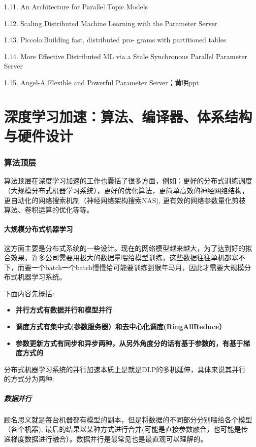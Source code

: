 \documentclass[12pt]{article}
\begin{document}
1.11. An Architecture for Parallel Topic Models

1.12. Scaling Distributed Machine Learning with the Parameter Server

1.13. Piccolo:Building fast, distributed pro- grams with partitioned tables  

1.14. More Effective Distributed ML via a Stale Synchronous Parallel Parameter Server

1.15. Angel-A Flexible and Powerful Parameter Server；黄明ppt

\part{深度学习加速：算法、编译器、体系结构与硬件设计\cite{Deep_Learning_Speed_Up}}
\setcounter{section}{0}
\section{算法顶层}
算法顶层在深度学习加速的工作也囊括了很多方面，例如：更好的分布式训练调度（大规模分布式机器学习系统），更好的优化算法，更简单高效的神经网络结构，更自动化的网络搜索机制（神经网络架构搜索NAS), 更有效的网络参数量化剪枝算法、卷积运算的优化等等。

\subsection{大规模分布式机器学习}
这方面主要是分布式系统的一些设计。现在的网络模型越来越大，为了达到好的拟合效果，许多公司需要用极大的数据量喂给模型训练，这些数据往往单机都塞不下，而要一个batch一个batch慢慢给可能要训练到猴年马月，因此才需要大规模分布式机器学习系统。

下面内容先概括:
\begin{itemize}
\setlength{\itemsep}{0pt}
\setlength{\parsep}{0pt}
\setlength{\parskip}{0pt}
    \item \textbf{并行方式有数据并行和模型并行}
    \item \textbf{调度方式有集中式(参数服务器）和去中心化调度(RingAllReduce）}
    \item \textbf{参数更新方式有同步和异步两种，从另外角度分的话有基于参数的，有基于梯度方式的}
\end{itemize}

分布式机器学习系统的并行加速本质上是就是DLP的多机延伸，具体来说其并行的方式分为两种:
\subsubsection{数据并行}
顾名思义就是每台机器都有模型的副本，但是将数据的不同部分分别喂给各个模型（各个机器), 最后的结果以某种方式进行合并(可能是直接参数融合，也可能是传递梯度数据进行融合）。数据并行是最常见也是最直观可以理解的。
\end{document}

